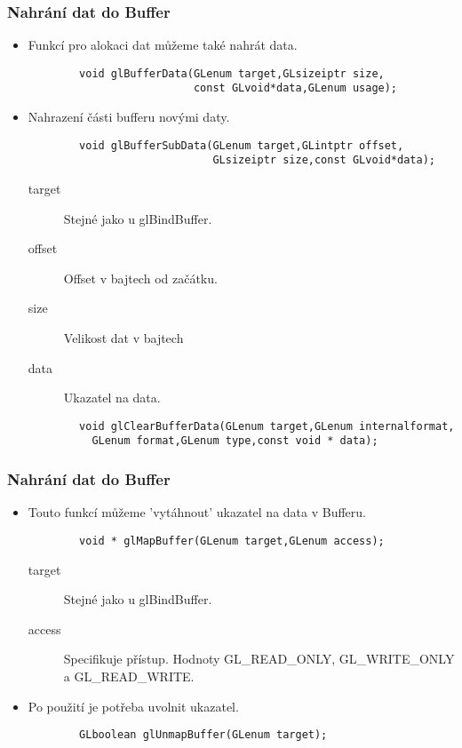\begin{frame}[fragile]
\frametitle{Nahrání dat do Buffer}
	\begin{itemize}

		\item{ Funkcí pro alokaci dat můžeme také nahrát data.
		{\scriptsize
		\begin{verbatim}
		void glBufferData(GLenum target,GLsizeiptr size,
		                  const GLvoid*data,GLenum usage);
		\end{verbatim}
		}}

		\item{ Nahrazení části bufferu novými daty.
		{\scriptsize
		\begin{verbatim}
		void glBufferSubData(GLenum target,GLintptr offset,
		                     GLsizeiptr size,const GLvoid*data);
		\end{verbatim}
		}
		\begin{description}
		\item[target] Stejné jako u {\color{blue} glBindBuffer}.
		\item[offset] Offset v bajtech od začátku.
		\item[size] Velikost dat v bajtech
		\item[data] Ukazatel na data.
		\end{description}
		}
		{\scriptsize
		\begin{verbatim}
		void glClearBufferData(GLenum target,GLenum internalformat,
		  GLenum format,GLenum type,const void * data);
		\end{verbatim}
		}
	\end{itemize}
\end{frame}

\begin{frame}[fragile]
\frametitle{Nahrání dat do Buffer}
	\begin{itemize}

		\item{ Touto funkcí můžeme 'vytáhnout' ukazatel na data v Bufferu.
		{\scriptsize
		\begin{verbatim}
		void * glMapBuffer(GLenum target,GLenum access);
		\end{verbatim}
		}
		\begin{description}
		\item[target] Stejné jako u {\color{blue} glBindBuffer}.
		\item[access] Specifikuje přístup. Hodnoty GL\_READ\_ONLY, GL\_WRITE\_ONLY a GL\_READ\_WRITE.
		\end{description}
		}
		\item{ Po použití je potřeba uvolnit ukazatel.
		{\scriptsize
		\begin{verbatim}
		GLboolean glUnmapBuffer(GLenum target);
		\end{verbatim}
		}}

	\end{itemize}
\end{frame}

